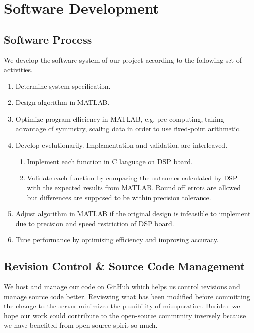 \section{Software Development}

\subsection{Software Process}
We develop the software system of our project according to the following set of activities.
\begin{enumerate}
\item Determine system specification.
\item Design algorithm in MATLAB.
\item Optimize program efficiency in MATLAB, e.g. pre-computing, taking advantage of symmetry, scaling data in order to use fixed-point arithmetic.
\item Develop evolutionarily. Implementation and validation are interleaved.
\begin{enumerate}
	\item Implement each function in C language on DSP board.
	\item Validate each function by comparing the outcomes calculated by DSP with the expected results from MATLAB. Round off errors are allowed but differences are supposed to be within precision tolerance.
\end{enumerate}
\item Adjust algorithm in MATLAB if the original design is infeasible to implement due to precision and speed restriction of DSP board.
\item Tune performance by optimizing efficiency and improving accuracy.
\end{enumerate}


\subsection{Revision Control \& Source Code Management}

We host and manage our code on GitHub which helps us control revisions and manage source code better. Reviewing what has been modified before committing the change to the server minimizes the possibility of misoperation. Besides, we hope our work could contribute to the open-source community inversely because we have benefited from open-source spirit so much.\\

